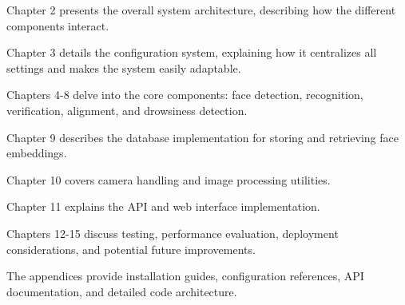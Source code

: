 Chapter 2 presents the overall system architecture, describing how the different components interact.

Chapter 3 details the configuration system, explaining how it centralizes all settings and makes the system easily adaptable.

Chapters 4-8 delve into the core components: face detection, recognition, verification, alignment, and drowsiness detection.

Chapter 9 describes the database implementation for storing and retrieving face embeddings.

Chapter 10 covers camera handling and image processing utilities.

Chapter 11 explains the API and web interface implementation.

Chapters 12-15 discuss testing, performance evaluation, deployment considerations, and potential future improvements.

The appendices provide installation guides, configuration references, API documentation, and detailed code architecture.